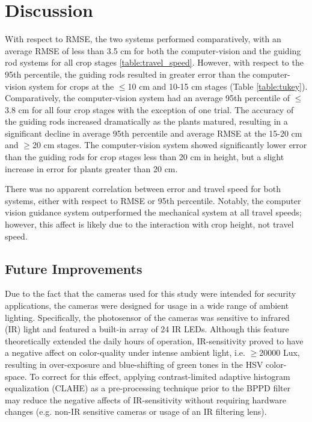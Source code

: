 \documentclass[authoryear]{elsarticle}
\begin{document}

\section{Discussion}
With respect to RMSE, the two systems performed comparatively, with an
average RMSE of less than 3.5 cm for both the computer-vision and the
guiding rod systems for all crop stages \ref{table:travel_speed}. However, with
respect to the 95th percentile, the guiding rods resulted in
greater error than the computer-vision system for crops at the $\le$10
cm and 10-15 cm stages (Table \ref{table:tukey}). Comparatively, the computer-vision
system had an average 95th percentile of $\le$3.8 cm for all four
crop stages with the exception of one trial. The accuracy of the guiding rods increased dramatically
as the plants matured, resulting in a significant decline in average
95th percentile and average RMSE at the 15-20 cm and $\ge$20 cm
stages. The computer-vision system showed significantly lower error
than the guiding rods for crop stages less than 20 cm in height, but a
slight increase in error for plants greater than 20 cm. 

There was no apparent correlation between error and travel speed for
both systems, either with respect to RMSE or 95th percentile. Notably,
the computer vision guidance system outperformed the mechanical system
at all travel speeds; however, this affect is likely due to the
interaction with crop height, not travel speed.

\subsection{Future Improvements}
Due to the fact that the cameras used for this study were intended for
security applications, the cameras were designed for usage in a wide
range of ambient lighting. Specifically, the photosensor of the
cameras was sensitive to infrared (IR) light and featured a built-in
array of 24 IR LEDs. Although this feature theoretically extended the
daily hours of operation, IR-sensitivity proved to have a negative
affect on color-quality under intense ambient light, i.e. $\ge$20000 Lux,
resulting in over-exposure and blue-shifting of green tones in the HSV
color-space. To correct for this effect, applying contrast-limited adaptive
histogram equalization (CLAHE) as a pre-processing technique prior to the BPPD
filter may reduce the negative affects of IR-sensitivity without
requiring hardware changes (e.g. non-IR sensitive cameras or usage of
an IR filtering lens).
\end{document}
